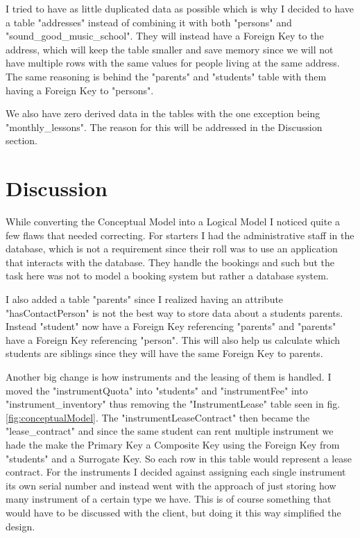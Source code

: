 \documentclass[a4paper]{scrreprt}
\begin{document}
I tried to have as little duplicated data as possible which is why I decided to have a table "addresses" instead of combining it with both "persons" and 
"sound\_good\_music\_school". They will instead have a Foreign Key to the address, which will keep the table smaller and save memory since we will not have multiple
rows with the same values for people living at the same address. The same reasoning is behind the "parents" and "students" table with them having a Foreign Key to 
"persons".

We also have zero derived data in the tables with the one exception being "monthly\_lessons". The reason for this will be addressed in the Discussion section.


\chapter{Discussion}
While converting the Conceptual Model into a Logical Model I noticed quite a few flaws that needed correcting. For starters I had the administrative staff in the database,
which is not a requirement since their roll was to use an application that interacts with the database. They handle the bookings and such but the task here was not to 
model a booking system but rather a database system. 

I also added a table "parents" since I realized having an attribute "hasContactPerson" is not the best way to store data about a students parents. Instead "student" now 
have a Foreign Key referencing "parents" and "parents" have a Foreign Key referencing "person". This will also help us calculate which students are siblings since they 
will have the same Foreign Key to parents. 

Another big change is how instruments and the leasing of them is handled. I moved the "instrumentQuota" into "students" and "instrumentFee" into "instrument\_inventory"
thus removing the "InstrumentLease" table seen in fig. \ref{fig:conceptualModel}. The "instrumentLeaseContract" then became the "lease\_contract" and since the same 
student can rent multiple instrument we hade the make the Primary Key a Composite Key using the Foreign Key from "students" and a Surrogate Key. So each row in this
table would represent a lease contract. For the instruments I decided against assigning each single instrument its own serial number and instead went with the approach
of just storing how many instrument of a certain type we have. This is of course something that would have to be discussed with the client, but doing it this way 
simplified the design. 
\end{document}
